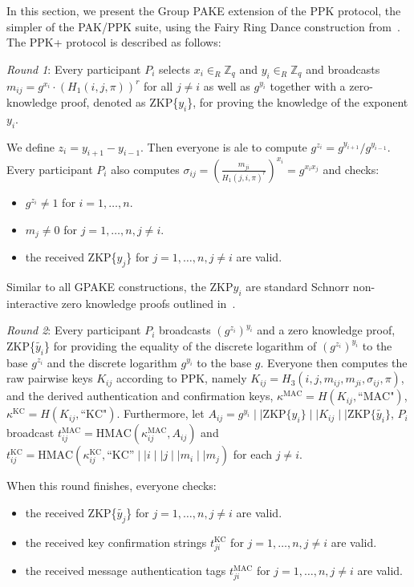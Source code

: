 In this section, we present the Group PAKE extension of the PPK protocol, the simpler of the PAK/PPK
suite, using the Fairy Ring Dance construction from~\cite{HaYiChSh15}. The PPK+ protocol is described as follows:

\emph{Round 1}: Every participant $P_i$ selects $x_i\in_R \mathbb{Z}_q$ and $y_i\in_R \mathbb{Z}_q$ and 
broadcasts $m_{ij} = g^{x_i}\cdot (H_1(i, j, \pi))^r$ for all $j \neq i$ as well as $g^{y_i}$ together with a 
zero-knowledge proof, denoted as ZKP\{$y_i$\}, for proving the knowledge of the exponent $y_i$.

We define $z_i = y_{i+1} - y_{i-1}$. Then everyone is ale to compute $g^{z_i} = g^{y_{i+1}}/g^{y_{i-1}}$. 
Every participant $P_i$ also computes $\sigma_{ij} = \left(\frac{m_{ji}}{H_1(j,i,\pi)^r}\right)^{x_i} = g^{x_i x_j}$
and checks:
\begin{itemize}
\item $g^{z_i} \neq 1$ for $i = 1, \ldots, n$.
\item $m_j \neq 0$ for $j = 1,\ldots,n, j\neq i$.
\item the received ZKP\{$y_j$\} for $j = 1,\ldots, n, j\neq i$ are valid.
\end{itemize}

Similar to all GPAKE constructions, the ZKP{$y_i$} are standard Schnorr non-interactive zero knowledge proofs outlined in~\cite{HaYiChSh15}.

\emph{Round 2}: Every participant $P_i$ broadcasts $(g^{z_i})^{y_i}$ and a zero knowledge proof,
ZKP\{$\tilde{y_i}$\} for providing the equality of the discrete logarithm of $(g^{z_i})^{y_i}$ to the base
$g^{z_i}$ and the discrete logarithm $g^{y_i}$ to the base $g$. Everyone then computes the raw pairwise
keys $K_{ij}$ according to PPK, namely $K_{ij} = H_3(i,j,m_{ij}, m_{ji}, \sigma_{ij}, \pi)$, and the derived
authentication and confirmation keys, $\kappa^{\text{MAC}} = H(K_{ij}, \text{``MAC"})$,
$\kappa^{\text{KC}} = H(K_{ij}, \text{``KC"})$. Furthermore, let
$A_{ij} = g^{y_i}\mid\mid \text{ZKP}\{y_i\}\mid\mid K_{ij}\mid\mid \text{ZKP}\{\tilde{y_i}\}$,
$P_i$ broadcast $t_{ij}^{\text{MAC}}  =\text{HMAC}(\kappa^{\text{MAC}}_{ij}, A_{ij})$ and
$t_{ij}^{\text{KC}}  = \text{HMAC}(\kappa^{\text{KC}}_{ij}, \text{``KC''}\mid\mid i\mid\mid j \mid\mid m_i \mid\mid m_j)$ for each $j \neq i$.


When this round finishes, everyone checks:
\begin{itemize}
\item the received ZKP\{$\tilde{y_j}$\} for $j = 1,\ldots, n, j\neq i$ are valid.
\item the received key confirmation strings $t^{\text{KC}}_{ji}$ for $j = 1,\ldots, n, j\neq i$ are valid.
\item the received message authentication tags $t^{\text{MAC}}_{ji}$ for $j = 1,\ldots, n, j\neq i$ are valid.
\end{itemize}

